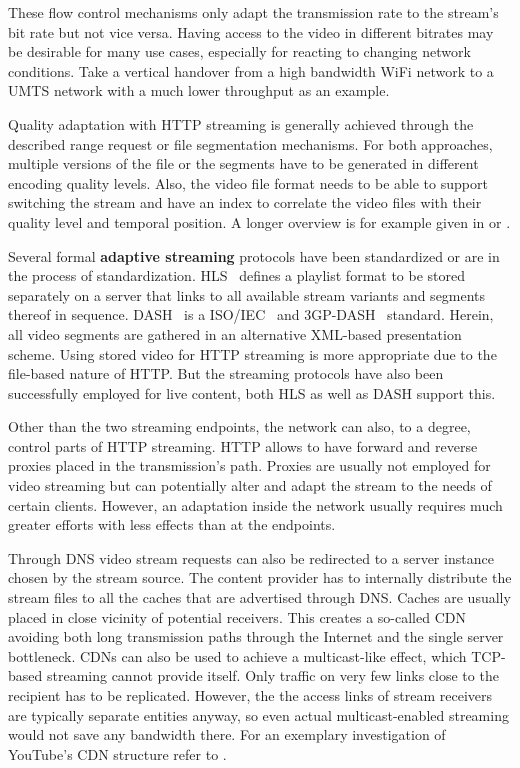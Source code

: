 These flow control mechanisms only adapt the transmission rate to the stream's bit rate but not vice versa. Having access to the video in different bitrates may be desirable for many use cases, especially for reacting to changing network conditions. Take a vertical handover from a high bandwidth WiFi network to a \gls{UMTS} network with a much lower throughput as an example. 

Quality adaptation with \gls{HTTP} streaming is generally achieved through the described range request or file segmentation mechanisms. For both approaches, multiple versions of the file or the segments have to be generated in different encoding quality levels. Also, the video file format needs to be able to support switching the stream and have an index to correlate the video files with their quality level and temporal position. A longer overview is for example given in \cite{ma2011mobile} or \cite{watching-video1}.

Several formal \textbf{adaptive streaming} protocols have been standardized or are in the process of standardization. \gls{HLS}~\cite{pantos2011livestreaming} defines a playlist format to be stored separately on a server that links to all available stream variants and segments thereof in sequence. \gls{DASH}~\cite{Stockhammer:2011:DAS:1943552.1943572} is a \acrshort{ISO}/\acrshort{IEC}~\cite{iso-iec-23009-1} and 3GP-DASH~\cite{3gpp.26.247} standard. 
Herein, all video segments are gathered in an alternative \acrshort{XML}-based presentation scheme. Using stored video for \gls{HTTP} streaming is more appropriate due to the file-based nature of \gls{HTTP}. But the streaming protocols have also been successfully employed for live content, both \gls{HLS} as well as \gls{DASH} support this.

Other than the two streaming endpoints, the network can also, to a degree, control parts of \gls{HTTP} streaming. \gls{HTTP} allows to have forward and reverse proxies placed in the transmission's path. Proxies are usually not employed for video streaming but can potentially alter and adapt the stream to the needs of certain clients. However, an adaptation inside the network usually requires much greater efforts with less effects than at the endpoints.

Through \acrshort{DNS} video stream requests can also be redirected to a server instance chosen by the stream source. The content provider has to internally distribute the stream files to all the caches that are advertised through \gls{DNS}. Caches are usually placed in close vicinity of potential receivers. This creates a so-called \gls{CDN} avoiding both long transmission paths through the Internet and the single server bottleneck. \glspl{CDN} can also be used to achieve a multicast-like effect, which \gls{TCP}-based streaming cannot provide itself. Only traffic on very few links close to the recipient has to be replicated. However, the the access links of stream receivers are typically separate entities anyway, so even actual multicast-enabled streaming would not save any bandwidth there. For an exemplary investigation of YouTube's \gls{CDN} structure refer to \cite{rafetseder2011explyt}.

